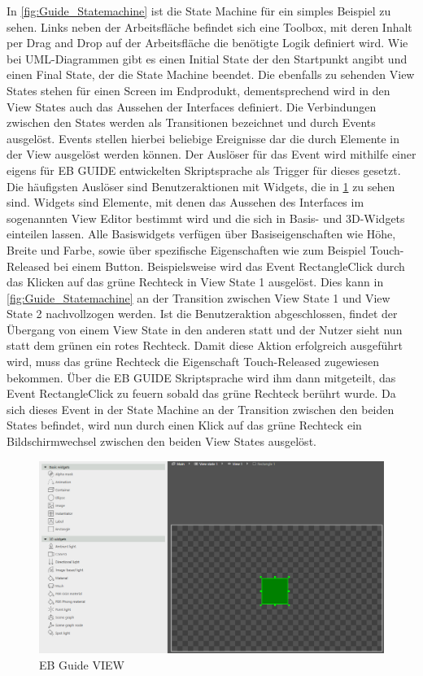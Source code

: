 In \cref{fig:Guide_Statemachine} ist die State Machine für ein simples Beispiel zu sehen.
Links neben der Arbeitsfläche befindet sich eine Toolbox, mit deren Inhalt per Drag and Drop auf der Arbeitsfläche die benötigte Logik definiert wird.
Wie bei UML-Diagrammen gibt es einen Initial State der den Startpunkt angibt und einen Final State, der die State Machine beendet.
Die ebenfalls zu sehenden View States stehen für einen Screen im Endprodukt, dementsprechend wird in den View States auch das Aussehen der Interfaces definiert.
Die Verbindungen zwischen den States werden als Transitionen bezeichnet und durch Events ausgelöst.
Events stellen hierbei beliebige Ereignisse dar die durch Elemente in der View ausgelöst werden können.
Der Auslöser für das Event wird mithilfe einer eigens für EB GUIDE entwickelten Skriptsprache als Trigger für dieses gesetzt.
Die häufigsten Auslöser sind Benutzeraktionen mit Widgets, die in \cref{fig:Guide_View} zu sehen sind.
Widgets sind Elemente, mit denen das Aussehen des Interfaces im sogenannten View Editor bestimmt wird und die sich in Basis- und 3D-Widgets einteilen lassen.
Alle Basiswidgets verfügen über Basiseigenschaften wie Höhe, Breite und Farbe, sowie über spezifische Eigenschaften wie zum Beispiel \glqq Touch-Released\grqq{} bei einem Button.\cite{studio_guide}
Beispielsweise wird das Event \glqq RectangleClick\grqq{} durch das Klicken auf das grüne Rechteck in View State 1 ausgelöst.
Dies kann in \cref{fig:Guide_Statemachine} an der Transition zwischen View State 1 und View State 2 nachvollzogen werden.
Ist die Benutzeraktion abgeschlossen, findet der Übergang von einem View State in den anderen statt und der Nutzer sieht nun statt dem grünen ein rotes Rechteck.
Damit diese Aktion erfolgreich ausgeführt wird, muss das grüne Rechteck die Eigenschaft \glqq Touch-Released\grqq{} zugewiesen bekommen.
Über die EB GUIDE Skriptsprache wird ihm dann mitgeteilt, das Event RectangleClick zu feuern sobald das grüne Rechteck berührt wurde.
Da sich dieses Event in der State Machine an der Transition zwischen den beiden States befindet, wird nun durch einen Klick auf das grüne Rechteck ein Bildschirmwechsel zwischen den beiden View States ausgelöst.

\begin{figure}[H]
\begin{center}
  \includegraphics[scale=0.4]{figures/Guide_View.PNG}
  \caption{EB Guide VIEW}
  \label{fig:Guide_View}
\end{center}
\end{figure}


